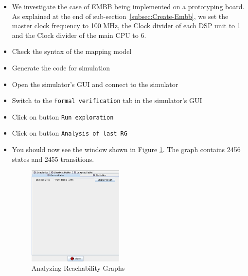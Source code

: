 \documentclass{llncs}
\begin{document}
\begin{itemize}
	\item We investigate the case of EMBB being implemented on a prototyping board. As explained at the end of
	sub-section~\ref{subsec:Create-Embb}, we set the master clock frequency to 100 MHz,
	the Clock divider of each DSP unit to 1 and the Clock divider of the main CPU to 6.
	\item Check the syntax of the mapping model 
    \item Generate the code for simulation
    \item Open the simulator's GUI and connect to the simulator
    \item Switch to the \texttt{Formal verification} tab in the simulator's GUI 
    \item Click on button \texttt{Run exploration}
    \item Click on button \texttt{Analysis of last RG}
    \item You should now see the window shown in Figure \ref{fig:RGAnalysis}. The graph contains 2456 states and 2455 transitions.


\begin{figure}[!htbp]
	\centering
	\includegraphics[width=0.45\textwidth]{figures/RGAnalysis.png}
	\caption{Analyzing Reachability Graphs}
	\label{fig:RGAnalysis}
\end{figure}


\end{itemize}
\end{document}
